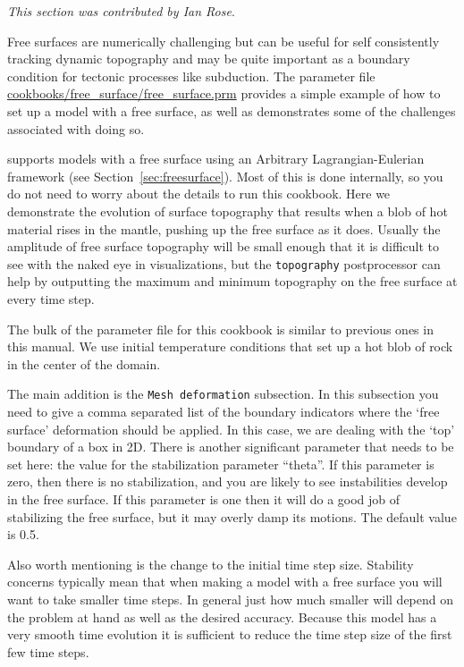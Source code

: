 \textit{This section was contributed by Ian Rose}.

Free surfaces are numerically challenging but can be useful for self consistently
tracking dynamic topography and may be quite important as a boundary condition
for tectonic processes like subduction. The parameter file \url{cookbooks/free_surface/free_surface.prm} 
provides a simple example of how to set up a model with a free surface, as well 
as demonstrates some of the challenges associated with doing so.

\aspect{} supports models with a free surface using an Arbitrary Lagrangian-Eulerian 
framework (see Section~\ref{sec:freesurface}). Most of this is done internally, so you do not need to worry about the
details to run this cookbook.  Here we demonstrate the evolution of surface topography 
that results when a blob of hot material rises in the mantle, pushing up the free
surface as it does.  Usually the amplitude of free surface topography 
will be small enough that it is difficult to see with the naked eye in visualizations,
but the \texttt{topography} postprocessor can help by outputting the maximum and minimum 
topography on the free surface at every time step. 

The bulk of the parameter file for this cookbook is similar to previous ones in this manual.
We use initial temperature conditions that set up a hot blob of rock in the center of the 
domain.

The main addition is the \texttt{Mesh deformation} subsection.
In this subsection you need to give \aspect{} a comma
separated list of the boundary indicators where the `free surface' deformation should be applied.
In this case, we are dealing with the `top' boundary of a box in 2D.
There is another significant parameter that needs to be set here: the value for the stabilization parameter ``theta''.
If this parameter is zero, then there is no stabilization, and you are likely to
see instabilities develop in the free surface. If this parameter is one then it
will do a good job of stabilizing the free surface, but it may overly damp its 
motions. The default value is 0.5.

Also worth mentioning is the change to the initial time step size. Stability concerns typically 
mean that when making a model with a free surface you will want to take smaller 
time steps. In general just how much smaller will depend on the problem at hand
as well as the desired accuracy. Because this model has a very smooth time evolution
it is sufficient to reduce the time step size of the first few time steps.

